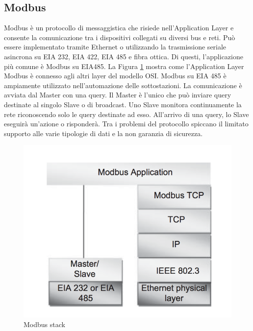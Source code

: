 \subsection{Modbus}
Modbus è un protocollo di messaggistica che risiede nell'Application Layer e consente la comunicazione tra i dispositivi collegati su diversi bus e reti. Può essere implementato tramite Ethernet o utilizzando la trasmissione seriale asincrona su EIA 232, EIA 422, EIA 485 e fibra ottica. Di questi, l'applicazione più comune è Modbus su EIA485. La Figura \ref{fig:modbus} mostra come l'Application Layer Modbus è connesso agli altri layer del modello OSI.
Modbus su EIA 485 è ampiamente utilizzato nell'automazione delle sottostazioni. La comunicazione è avviata dal Master con una query. Il Master è l'unico che può inviare query destinate al singolo Slave o di broadcast. Uno Slave monitora continuamente la rete riconoscendo solo le query destinate ad esso. All'arrivo di una query, lo Slave eseguirà un'azione o risponderà. Tra i problemi del protocollo spiccano il limitato supporto alle varie tipologie di dati e la non garanzia di sicurezza.
\begin{figure}[h]
	\centering
	\includegraphics[scale=0.500]{imgs/modbus.png}
	\caption{Modbus stack} \label{fig:modbus}
\end{figure}
